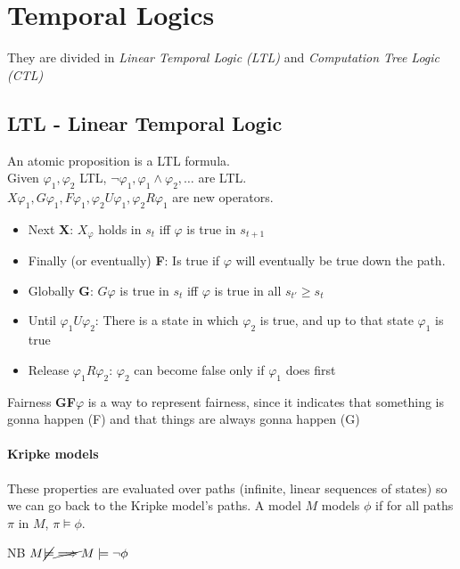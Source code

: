 \documentclass{article}
\begin{document}
\section{Temporal Logics}
They are divided in \textit{Linear Temporal Logic (LTL)} and \textit{Computation Tree Logic (CTL)}

\subsection{LTL - Linear Temporal Logic}
An atomic proposition is a LTL formula.\\
Given $\varphi_1, \varphi_2$ LTL, $\neg\varphi_1,\varphi_1\wedge\varphi_2,\dots$ are LTL.\\
$X{\varphi_1}, G{\varphi_1}, F{\varphi_1},\varphi_2 U\varphi_1,\varphi_2 R\varphi_1$ are new operators.
\begin{itemize}
    \item Next \textbf{X}: $X_\varphi$ holds in $s_t$ iff $\varphi$ is true in $s_{t+1}$
    \item Finally (or eventually) \textbf{F}: Is true if $\varphi$ will eventually be true down the path.
\item Globally \textbf{G}: $G\varphi$ is true in $s_t$ iff $\varphi$ is true in all $s_{t'}\geq s_t$
    \item Until $\varphi_1 U \varphi_2$: There is a state in which $\varphi_2$ is true, and up to that state $\varphi_1$ is true
    \item Release $\varphi_1 R \varphi_2$: $\varphi_2$ can become false only if $\varphi_1$ does first
\end{itemize}

\begin{callout}{Fairness}
    \textbf{GF}$\varphi$ is a way to represent fairness, since it indicates that something is gonna happen (F) and that things are always gonna happen (G)
\end{callout}

\paragraph*{Kripke models}
These properties are evaluated over paths (infinite, linear sequences of states) so we can go back to the Kripke model's paths. A model $M$ models $\phi$ if for all paths $\pi$ in $M$, $\pi\models\phi$.

\begin{callout}[red]{NB}
    $M\cancel\models \cancel\implies M\models\neg\phi$
\end{callout}
\end{document}
